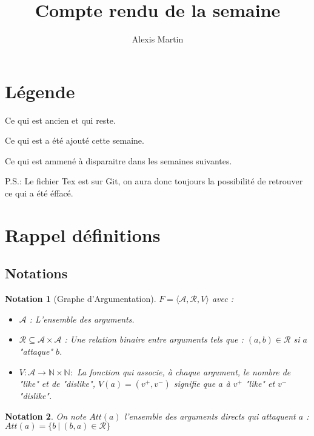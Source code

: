 \documentclass[12pt]{article}
\title{Compte rendu de la semaine}
\author{Alexis Martin}
\theoremstyle{defi}
\theoremstyle{not}
\newtheorem{notation}{Notation}[section]
\theoremstyle{prob}
\begin{document}
\maketitle

\section{Légende}
\color{black}
Ce qui est ancien et qui reste.

\color{blue}
Ce qui est a été ajouté cette semaine.

\color{red}
Ce qui est ammené à disparaitre dans les semaines suivantes.

P.S.: Le fichier Tex est sur Git, on aura donc toujours la possibilité de retrouver ce qui a été éffacé.

\color{black}
\section{Rappel définitions}
  \subsection{Notations}
    \begin{notation}[Graphe d'Argumentation]

      $F = \langle \mathcal{A}, \mathcal{R}, V \rangle$ avec :
      \begin{itemize}
        \item $\mathcal{A}$ : L'ensemble des arguments.
        \item $\mathcal{R} \subseteq \mathcal{A} \times \mathcal{A}$ : Une relation binaire entre arguments tels que : $(a,b) \in \mathcal{R}$ si $a$ "attaque" $b$.
        \item $V: \mathcal{A} \rightarrow \mathbb{N} \times \mathbb{N} :$ La fonction qui associe, à chaque argument, le nombre de "like" et de "dislike", $V(a) = (v^+, v^-)$ signifie que $a$ à $v^+$ "like" et $v^-$ "dislike".
      \end{itemize}
    \end{notation}

    \begin{notation}
      On note $Att(a)$ l'ensemble des arguments directs qui attaquent $a$ :
      $Att(a) = \{b\ |\ (b, a)\in \mathcal{R}\}$
    \end{notation}
\end{document}

